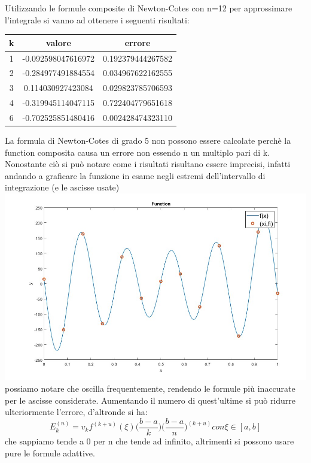 \documentclass[12pt]{article}
\begin{document}
Utilizzando le formule composite di Newton-Cotes con n=12 per approssimare l'integrale si vanno ad ottenere i seguenti risultati: \\

\begin{center}
    \begin{tabular}{||c || c | c ||} 
        \hline
        k & valore & errore \\
        \hline
        \hline
        1 & -0.092598047616972 & 0.192379444267582 \\
        \hline
        2 & -0.284977491884554 & 0.034967622162555 \\
        \hline
        3 & 0.114030927423084 & 0.029823785706593 \\
        \hline
        4 & -0.319945114047115 & 0.722404779651618 \\
        \hline
        6 & -0.702525851480416 & 0.002428474323110 \\
        \hline
        \hline
    \end{tabular}
    \end{center}
La formula di Newton-Cotes di grado 5 non possono essere calcolate perchè la function composita causa un errore non essendo n un multiplo pari di k.
Nonostante ciò si può notare come i risultati risultano essere imprecisi, infatti andando a graficare la funzione in esame negli estremi dell'intervallo di integrazione (e le ascisse usate) \\
\includegraphics[width=\linewidth]{plot27.jpg}
possiamo notare che oscilla frequentemente, rendendo le formule più inaccurate per le ascisse considerate.
Aumentando il numero di quest'ultime si può ridurre ulteriormente l'errore, d'altronde si ha:
$$E_k^{(n)} = v_k f^{(k+u)}(\xi)\biggl(\frac{b-a}{k}\biggr)\biggl(\frac{b-a}{n}\biggr)^{(k+u)} con  \xi \in [a,b]$$
che sappiamo tende a 0 per n che tende ad infinito, altrimenti si possono usare pure le formule adattive.
\newpage
\end{document}
